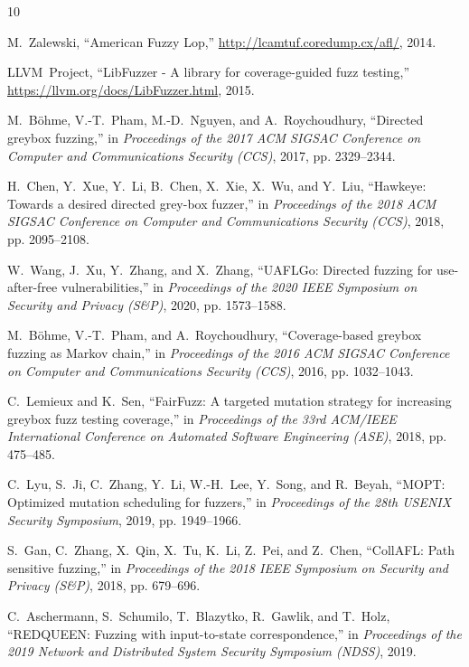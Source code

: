 \documentclass[review]{elsarticle}
\begin{document}
\begin{thebibliography}{10}

M.~Zalewski, ``American Fuzzy Lop,'' \url{http://lcamtuf.coredump.cx/afl/}, 2014.

LLVM~Project, ``LibFuzzer - A library for coverage-guided fuzz testing,'' \url{https://llvm.org/docs/LibFuzzer.html}, 2015.

M.~Böhme, V.-T.~Pham, M.-D.~Nguyen, and A.~Roychoudhury, ``Directed greybox fuzzing,'' in \emph{Proceedings of the 2017 ACM SIGSAC Conference on Computer and Communications Security (CCS)}, 2017, pp. 2329--2344.

H.~Chen, Y.~Xue, Y.~Li, B.~Chen, X.~Xie, X.~Wu, and Y.~Liu, ``Hawkeye: Towards a desired directed grey-box fuzzer,'' in \emph{Proceedings of the 2018 ACM SIGSAC Conference on Computer and Communications Security (CCS)}, 2018, pp. 2095--2108.

W.~Wang, J.~Xu, Y.~Zhang, and X.~Zhang, ``UAFLGo: Directed fuzzing for use-after-free vulnerabilities,'' in \emph{Proceedings of the 2020 IEEE Symposium on Security and Privacy (S\&P)}, 2020, pp. 1573--1588.

M.~Böhme, V.-T.~Pham, and A.~Roychoudhury, ``Coverage-based greybox fuzzing as Markov chain,'' in \emph{Proceedings of the 2016 ACM SIGSAC Conference on Computer and Communications Security (CCS)}, 2016, pp. 1032--1043.

C.~Lemieux and K.~Sen, ``FairFuzz: A targeted mutation strategy for increasing greybox fuzz testing coverage,'' in \emph{Proceedings of the 33rd ACM/IEEE International Conference on Automated Software Engineering (ASE)}, 2018, pp. 475--485.

C.~Lyu, S.~Ji, C.~Zhang, Y.~Li, W.-H.~Lee, Y.~Song, and R.~Beyah, ``MOPT: Optimized mutation scheduling for fuzzers,'' in \emph{Proceedings of the 28th USENIX Security Symposium}, 2019, pp. 1949--1966.

S.~Gan, C.~Zhang, X.~Qin, X.~Tu, K.~Li, Z.~Pei, and Z.~Chen, ``CollAFL: Path sensitive fuzzing,'' in \emph{Proceedings of the 2018 IEEE Symposium on Security and Privacy (S\&P)}, 2018, pp. 679--696.

C.~Aschermann, S.~Schumilo, T.~Blazytko, R.~Gawlik, and T.~Holz, ``REDQUEEN: Fuzzing with input-to-state correspondence,'' in \emph{Proceedings of the 2019 Network and Distributed System Security Symposium (NDSS)}, 2019.


\end{thebibliography}
\end{document}

